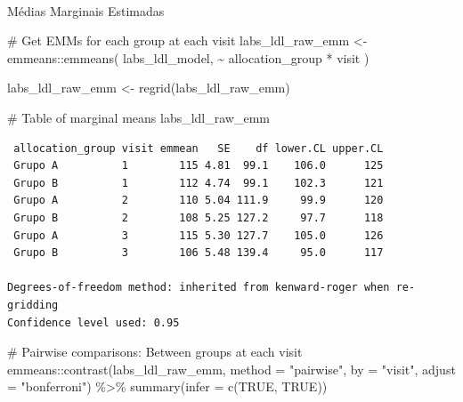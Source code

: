 \documentclass[
  letterpaper,
  DIV=11,
  numbers=noendperiod]{scrartcl}
\makeatletter
\let\oldparagraph\paragraph
\renewcommand{\paragraph}{
    \@ifstar
      \xxxParagraphStar
      \xxxParagraphNoStar
  }
\newcommand{\xxxParagraphStar}[1]{\oldparagraph*{#1}\mbox{}}
\newcommand{\xxxParagraphNoStar}[1]{\oldparagraph{#1}\mbox{}}
\newenvironment{Shaded}{\begin{snugshade}}{\end{snugshade}}
\newcommand{\AttributeTok}[1]{\textcolor[rgb]{0.40,0.45,0.13}{#1}}
\newcommand{\CommentTok}[1]{\textcolor[rgb]{0.37,0.37,0.37}{#1}}
\newcommand{\ConstantTok}[1]{\textcolor[rgb]{0.56,0.35,0.01}{#1}}
\newcommand{\FunctionTok}[1]{\textcolor[rgb]{0.28,0.35,0.67}{#1}}
\newcommand{\NormalTok}[1]{\textcolor[rgb]{0.00,0.23,0.31}{#1}}
\newcommand{\OtherTok}[1]{\textcolor[rgb]{0.00,0.23,0.31}{#1}}
\newcommand{\SpecialCharTok}[1]{\textcolor[rgb]{0.37,0.37,0.37}{#1}}
\newcommand{\StringTok}[1]{\textcolor[rgb]{0.13,0.47,0.30}{#1}}
\makeatother
\begin{document}
\paragraph{Médias Marginais
Estimadas}\label{muxe9dias-marginais-estimadas-5}

\begin{Shaded}
\begin{Highlighting}[]
\CommentTok{\# Get EMMs for each group at each visit}
\NormalTok{labs\_ldl\_raw\_emm }\OtherTok{\textless{}{-}}\NormalTok{ emmeans}\SpecialCharTok{::}\FunctionTok{emmeans}\NormalTok{(}
\NormalTok{    labs\_ldl\_model, }
    \SpecialCharTok{\textasciitilde{}}\NormalTok{ allocation\_group }\SpecialCharTok{*}\NormalTok{ visit}
\NormalTok{)}

\NormalTok{labs\_ldl\_raw\_emm }\OtherTok{\textless{}{-}} \FunctionTok{regrid}\NormalTok{(labs\_ldl\_raw\_emm)}

\CommentTok{\# Table of marginal means}
\NormalTok{labs\_ldl\_raw\_emm}
\end{Highlighting}
\end{Shaded}

\begin{verbatim}
 allocation_group visit emmean   SE    df lower.CL upper.CL
 Grupo A          1        115 4.81  99.1    106.0      125
 Grupo B          1        112 4.74  99.1    102.3      121
 Grupo A          2        110 5.04 111.9     99.9      120
 Grupo B          2        108 5.25 127.2     97.7      118
 Grupo A          3        115 5.30 127.7    105.0      126
 Grupo B          3        106 5.48 139.4     95.0      117

Degrees-of-freedom method: inherited from kenward-roger when re-gridding 
Confidence level used: 0.95 
\end{verbatim}

\begin{Shaded}
\begin{Highlighting}[]
\CommentTok{\# Pairwise comparisons: Between groups at each visit}
\NormalTok{emmeans}\SpecialCharTok{::}\FunctionTok{contrast}\NormalTok{(labs\_ldl\_raw\_emm, }\AttributeTok{method =} \StringTok{"pairwise"}\NormalTok{, }\AttributeTok{by =} \StringTok{"visit"}\NormalTok{, }\AttributeTok{adjust =} \StringTok{"bonferroni"}\NormalTok{) }\SpecialCharTok{\%\textgreater{}\%} \FunctionTok{summary}\NormalTok{(}\AttributeTok{infer =} \FunctionTok{c}\NormalTok{(}\ConstantTok{TRUE}\NormalTok{, }\ConstantTok{TRUE}\NormalTok{))}
\end{Highlighting}
\end{Shaded}
\end{document}
